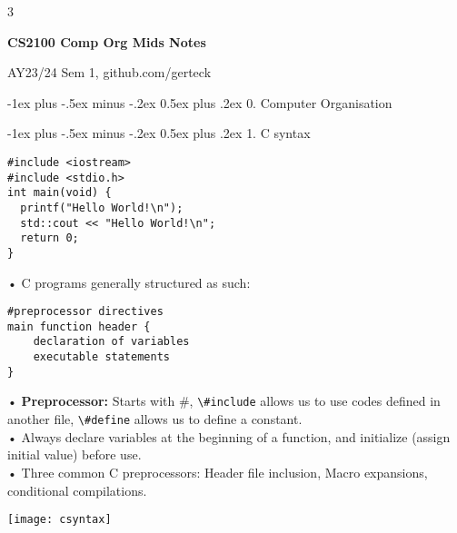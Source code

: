 \documentclass[12pt, landscape]{article}
\makeatletter
\newcommand{\code}[1]{\colorbox{gray!25!}{\lstinline[basicstyle=\scriptsize]|#1|}}
\renewcommand{\section}{\@startsection{section}{1}{0mm}%
                                {-1ex plus -.5ex minus -.2ex}%
                                {0.5ex plus .2ex}%
                                {\normalfont\large\bfseries}}
\makeatother
\begin{document}
\raggedright
\footnotesize
\begin{multicols*}{3}



\setlength{\premulticols}{1pt}
\setlength{\postmulticols}{1pt}
\setlength{\multicolsep}{1pt}
\setlength{\columnsep}{2pt}

\begin{center}
     \Large{\textbf{CS2100 Comp Org Mids Notes}} \\
\end{center}
AY23/24 Sem 1, github.com/gerteck

\section{0. Computer Organisation}

\section{1. C syntax}
\begin{lstlisting}
#include <iostream>
#include <stdio.h>
int main(void) {
  printf("Hello World!\n");
  std::cout << "Hello World!\n";
  return 0;
}
\end{lstlisting}
• C programs generally structured as such: 
\begin{lstlisting}
#preprocessor directives
main function header {
	declaration of variables
	executable statements
}
\end{lstlisting}
• \textbf{Preprocessor:} Starts with \#, \code{\#include} allows us to use codes defined in another file, \code{\#define} allows us to define a constant. \\
• Always declare variables at the beginning of a function, and initialize (assign initial value) before use. \\
• Three common C preprocessors: Header file inclusion, Macro expansions, conditional compilations.
\centerline{\texttt{[image: csyntax]}} 


\end{multicols*}
\end{document}
